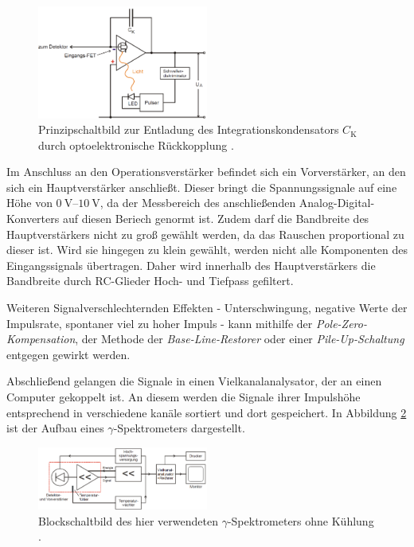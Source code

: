 \begin{figure}
	\centering
	\includegraphics[width = 0.5\textwidth]{pic/schaltung2.png}
	\caption{Prinzipschaltbild zur Entladung des Integrationskondensators $C_\text{K}$ durch optoelektronische Rückkopplung \cite{anleitung}.}
	\label{schaltung2}
\end{figure}

\FloatBarrier

Im Anschluss an den Operationsverstärker befindet sich ein Vorverstärker, an den sich ein Hauptverstärker anschließt.
Dieser bringt die Spannungssignale auf eine Höhe von $\SIrange{0}{10}{\volt}$, da der Messbereich des anschließenden Analog-Digital-Konverters auf diesen Beriech genormt ist.
Zudem darf die Bandbreite des Hauptverstärkers nicht zu groß gewählt werden, da das Rauschen proportional zu dieser ist.
Wird sie hingegen zu klein gewählt, werden nicht alle Komponenten des Eingangssignals übertragen.
Daher wird innerhalb des Hauptverstärkers die Bandbreite durch RC-Glieder Hoch- und Tiefpass gefiltert.

Weiteren Signalverschlechternden Effekten - Unterschwingung, negative Werte der Impulsrate, spontaner viel zu hoher Impuls - kann mithilfe der \textit{Pole-Zero-Kompensation}, der Methode der \textit{Base-Line-Restorer} oder einer \textit{Pile-Up-Schaltung} entgegen gewirkt werden.

Abschließend gelangen die Signale in einen Vielkanalanalysator, der an einen Computer gekoppelt ist.
An diesem werden die Signale ihrer Impulshöhe entsprechend in verschiedene kanäle sortiert und dort gespeichert.
In Abbildung \ref{schaltung3} ist der Aufbau eines $\gamma$-Spektrometers dargestellt.

\begin{figure}
	\centering
	\includegraphics[width = 0.5\textwidth]{pic/schaltung3.png}
	\caption{Blockschaltbild des hier verwendeten $\gamma$-Spektrometers ohne Kühlung \cite{anleitung}.}
	\label{schaltung3}
\end{figure}

